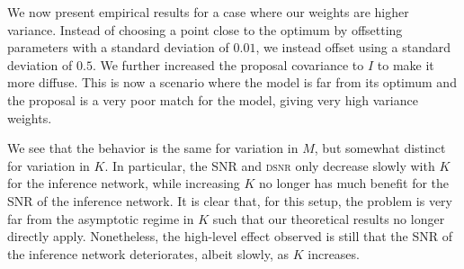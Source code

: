 We now present empirical results for a case where our weights are higher variance. Instead
of choosing a point close to the optimum by offsetting parameters with a standard deviation of $0.01$, 
we instead offset using a standard deviation of $0.5$.  We further increased the proposal covariance to $I$
to make it more diffuse.  This is now a scenario where the model is far from its optimum and the proposal
is a very poor match for the model, giving very high variance weights.


We see that the behavior is the
same for variation in $M$, but somewhat distinct for variation in $K$.  
In particular, the \gls{SNR} and \textsc{dsnr} only decrease slowly with $K$ for the inference network, while increasing $K$ no longer has much benefit for the \gls{SNR} of the
inference network.
It is clear that, for this
setup, the problem is very far from the asymptotic regime in $K$ such that our theoretical results no
longer directly apply.  Nonetheless, the high-level effect observed is still that the \gls{SNR} of 
the inference
network deteriorates, albeit slowly, as $K$ increases.


